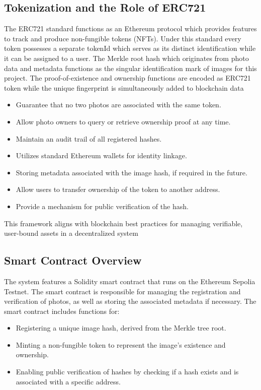 \subsection{Tokenization and the Role of ERC721}
The ERC721 standard functions as an Ethereum protocol which provides features to track and produce non-fungible tokens (NFTs). Under this standard every token possesses a separate tokenId which serves as its distinct identification while it can be assigned to a user. The Merkle root hash which originates from photo data and metadata functions as the singular identification mark of images for this project. The proof-of-existence and ownership functions are encoded as ERC721 token while the unique fingerprint is simultaneously added to blockchain data

\begin{itemize}
    \item Guarantee that no two photos are associated with the same token.
    \item Allow photo owners to query or retrieve ownership proof at any time.
    \item Maintain an audit trail of all registered hashes.
    \item Utilizes standard Ethereum wallets for identity linkage.
    \item Storing metadata associated with the image hash, if required in the future.
    \item Allow users to transfer ownership of the token to another address.
    \item Provide a mechanism for public verification of the hash.
\end{itemize}

This framework aligns with blockchain best practices for managing verifiable, user-bound assets in a decentralized system

\subsection{Smart Contract Overview}
The system features a Solidity smart contract that runs on the Ethereum Sepolia Testnet. The smart contract is responsible for managing the registration and verification of photos, as well as storing the associated metadata if necessary. The smart contract includes functions for:

\begin{itemize}
    \item Registering a unique image hash, derived from the Merkle tree root.
    \item Minting a non-fungible token to represent the image’s existence and ownership.
    \item Enabling public verification of hashes by checking if a hash exists and is associated with a specific address.
\end{itemize}

